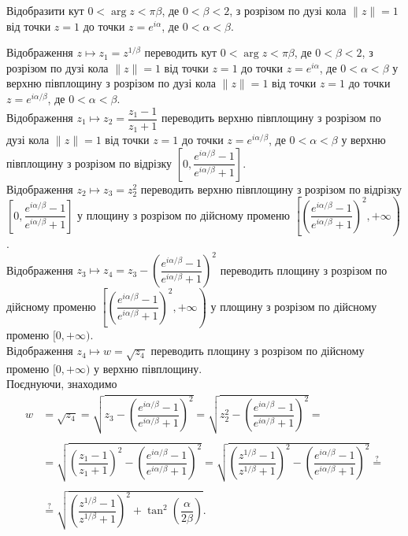 \begin{problem}[Волковиський, 2.102]
    Відобразити кут $0 < \arg z < \pi \beta$, де $0 < \beta < 2$, з розрізом по дузі кола $\|z\| = 1$ від точки $z = 1$ до точки $z = e^{i \alpha}$, де $0 < \alpha < \beta$.
\end{problem}

\begin{solution}
    Відображення $z \mapsto z_1 = z^{1/\beta}$ переводить кут $0 < \arg z < \pi \beta$, де $0 < \beta < 2$, з розрізом по дузі кола $\|z\| = 1$ від точки $z = 1$ до точки $z = e^{i \alpha}$, де $0 < \alpha < \beta$ у верхню півплощину з розрізом по дузі кола $\|z\| = 1$ від точки $z = 1$ до точки $z = e^{i \alpha / \beta}$, де $0 < \alpha < \beta$. \\
    
    Відображення $z_1 \mapsto z_2 = \dfrac{z_1 - 1}{z_1 + 1}$ переводить верхню півплощину з розрізом по дузі кола $\|z\| = 1$ від точки $z = 1$ до точки $z = e^{i \alpha / \beta}$, де $0 < \alpha < \beta$ у верхню півплощину з розрізом по відрізку $\left[0, \dfrac{e^{i \alpha / \beta} - 1}{e^{i \alpha / \beta} + 1}\right]$. \\
    
    Відображення $z_2 \mapsto z_3 = z_2^2$ переводить верхню півплощину з розрізом по відрізку $\left[0, \dfrac{e^{i \alpha / \beta} - 1}{e^{i \alpha / \beta} + 1}\right]$ у площину з розрізом по дійсному променю $\left[\left(\dfrac{e^{i \alpha / \beta} - 1}{e^{i \alpha / \beta} + 1}\right)^2, +\infty\right)$. \\
    
    Відображення $z_3 \mapsto z_4 = z_3 - \left(\dfrac{e^{i \alpha / \beta} - 1}{e^{i \alpha / \beta} + 1}\right)^2$ переводить площину з розрізом по дійсному променю $\left[\left(\dfrac{e^{i \alpha / \beta} - 1}{e^{i \alpha / \beta} + 1}\right)^2, +\infty\right)$ у площину з розрізом по дійсному променю $[0, +\infty)$. \\
    
    Відображення $z_4 \mapsto w = \sqrt{z_4}$ переводить площину з розрізом по дійсному променю $[0,+\infty)$ у верхню півплощину. \\
    
    Поєднуючи, знаходимо 
    \begin{align*}
        w &= \sqrt{z_4} = \sqrt{z_3 - \left(\dfrac{e^{i \alpha / \beta} - 1}{e^{i \alpha / \beta} + 1}\right)^2} = \sqrt{z_2^2 - \left(\dfrac{e^{i \alpha / \beta} - 1}{e^{i \alpha / \beta} + 1}\right)^2} = \\
        \\
        &= \sqrt{\left( \dfrac{z_1 - 1}{z_1 + 1}\right)^2 - \left(\dfrac{e^{i \alpha / \beta} - 1}{e^{i \alpha / \beta} + 1}\right)^2} = \sqrt{\left( \dfrac{z^{1/\beta} - 1}{z^{1/\beta} + 1}\right)^2 - \left(\dfrac{e^{i \alpha / \beta} - 1}{e^{i \alpha / \beta} + 1}\right)^2} \overset{?}{=} \\
        \\
        &\overset{?}{=} \sqrt{\left( \dfrac{z^{1/\beta} - 1}{z^{1/\beta} + 1}\right)^2 + \tan^2 \left(\dfrac{\alpha}{2\beta}\right)}.
    \end{align*}
\end{solution}

